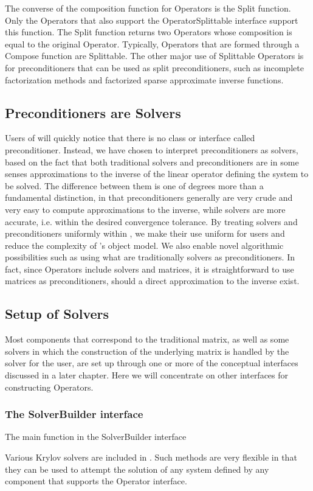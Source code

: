 The converse of the composition function for Operators is the Split function.
Only the Operators that also support the OperatorSplittable interface support
this function.
The Split function returns two Operators whose composition is equal to 
the original Operator.
Typically, Operators that are formed through a Compose function are Splittable.
The other major use of Splittable Operators is for preconditioners that can be 
used as split preconditioners, such as incomplete factorization methods and
factorized sparse approximate inverse functions.

\subsection{Preconditioners are Solvers}

Users of \hypre{} will quickly notice that there is
no class or interface called 
preconditioner. Instead, we have chosen to interpret preconditioners as
solvers, based on the fact that 
both traditional solvers and preconditioners are in some senses approximations
to the inverse of the linear 
operator defining the system to be solved. The difference between them is one
of degrees more than a fundamental distinction, in that 
preconditioners generally are very crude and very easy to compute
approximations to the inverse, while 
solvers are more accurate, i.e. within the desired convergence tolerance. By
treating solvers and 
preconditioners uniformly within \hypre{}, we make their use uniform for users and
reduce the complexity 
of \hypre{}'s object model. We also enable novel algorithmic possibilities such as
using what are 
traditionally solvers as preconditioners. In fact, since Operators include
solvers and matrices, it is 
straightforward to use matrices as preconditioners, should a direct
approximation to the inverse exist. 

\subsection{Setup of Solvers}

Most components that correspond to the traditional matrix, as well as
some solvers in which the 
construction of the underlying matrix is handled by the solver for the user,
are set up through one or more 
of the conceptual interfaces discussed in a later chapter. Here we will
concentrate on other interfaces for
constructing Operators.

\subsubsection{The SolverBuilder interface}

The main function in the SolverBuilder interface


Various Krylov solvers are included in \hypre{}.
Such methods are very flexible in that they can be used to attempt
the solution of any system defined by any component that supports the
Operator interface.

